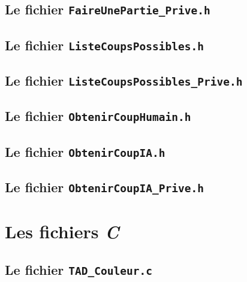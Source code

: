 \section{Le fichier \tt{FaireUnePartie\_Prive.h}}


\section{Le fichier \tt{ListeCoupsPossibles.h}}


\section{Le fichier \tt{ListeCoupsPossibles\_Prive.h}}


\section{Le fichier \tt{ObtenirCoupHumain.h}}


\section{Le fichier \tt{ObtenirCoupIA.h}}


\section{Le fichier \tt{ObtenirCoupIA\_Prive.h}}




\chapter{Les fichiers \emph{C}}

\section{Le fichier \tt{TAD\_Couleur.c}}


